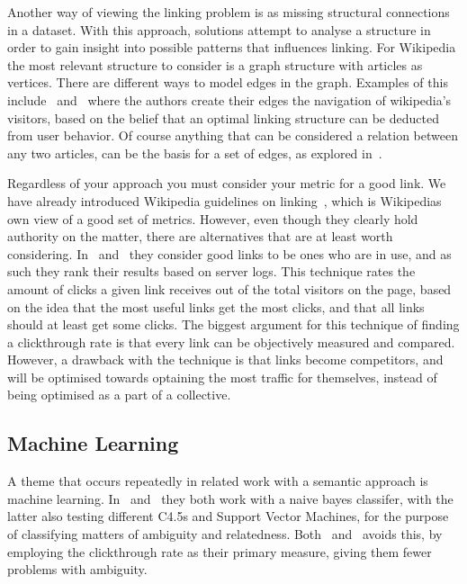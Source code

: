 Another way of viewing the linking problem is as missing structural connections in a dataset. With this approach, solutions attempt to analyse a structure in order to gain insight into possible patterns that influences linking. For Wikipedia the most relevant structure to consider is a graph structure with articles as vertices. There are different ways to model edges in the graph. Examples of this include~\cite{hyperlink-structure-using-logs} and~\cite{west2015mining} where the authors create their edges the navigation of wikipedia's visitors, based on the belief that an optimal linking structure can be deducted from user behavior. Of course anything that can be considered a relation between any two articles, can be the basis for a set of edges, as explored in~\cite{lu2011link}.

Regardless of your approach you must consider your metric for a good link. We have already introduced Wikipedia guidelines on linking~\cite{wiki-editor-guidelines}, which is Wikipedias own view of a good set of metrics. However, even though they clearly hold authority on the matter, there are alternatives that are at least worth considering. In~\cite{hyperlink-structure-using-logs} and~\cite{west2015mining} they consider good links to be ones who are in use, and as such they rank their results based on server logs. This technique rates the amount of clicks a given link receives out of the total visitors on the page, based on the idea that the most useful links get the most clicks, and that all links should at least get some clicks. The biggest argument for this technique of finding a clickthrough rate is that every link can be objectively measured and compared. However, a drawback with the technique is that links become competitors, and will be optimised towards optaining the most traffic for themselves, instead of being optimised as a part of a collective.

\subsection{Machine Learning}\label{related_machine_learning}

A theme that occurs repeatedly in related work with a semantic approach is machine learning. In~\cite{mihalcea2007wikify} and~\cite{milne2008learning} they both work with a naive bayes classifer, with the latter also testing different C4.5s and Support Vector Machines, for the purpose of classifying matters of ambiguity and relatedness. Both~\cite{hyperlink-structure-using-logs} and~\cite{west2015mining} avoids this, by employing the clickthrough rate as their primary measure, giving them fewer problems with ambiguity.

